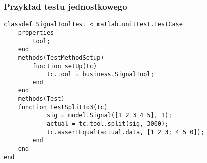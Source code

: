\documentclass{beamer}
\begin{document}
\begin{frame}[fragile]
  \frametitle{Przykład testu jednostkowego}
\begin{lstlisting}
classdef SignalToolTest < matlab.unittest.TestCase
    properties
        tool;
    end
    methods(TestMethodSetup)
        function setUp(tc)
            tc.tool = business.SignalTool;
        end
    end
    methods(Test)
	function testSplitTo3(tc)
            sig = model.Signal([1 2 3 4 5], 1);
            actual = tc.tool.split(sig, 3000);
            tc.assertEqual(actual.data, [1 2 3; 4 5 0]);
        end
    end
end
\end{lstlisting}
\end{frame}
\end{document}
